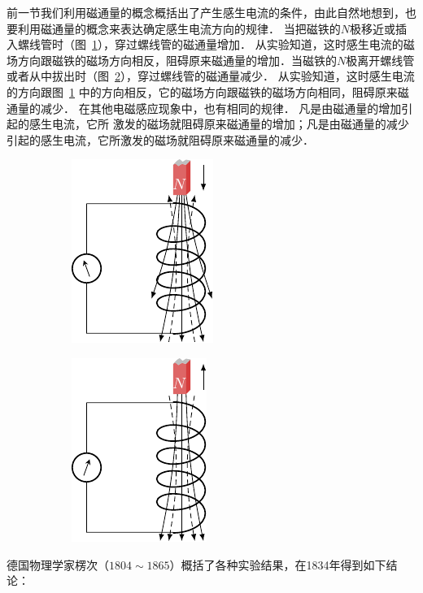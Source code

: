 前一节我们利用磁通量的概念概括出了产生感生电流的条件，由此自然地想到，也要利用磁通量的概念来表达确定感生电流方向的规律．
当把磁铁的$N$极移近或插入螺线管时（图~\ref{fig_C_2-11a}），穿过螺线管的磁通量增加．
从实验知道，这时感生电流的磁场方向跟磁铁的磁场方向相反，阻碍原来磁通量的增加．当磁铁的$N$极离开螺线管或者从中拔出时（图~\ref{fig_C_2-11b}），穿过螺线管的磁通量减少．
从实验知道，这时感生电流的方向跟图~\ref{fig_C_2-11a} 中的方向相反，它的磁场方向跟磁铁的磁场方向相同，阻碍原来磁通量的减少．
在其他电磁感应现象中，也有相同的规律．
凡是由磁通量的增加引起的感生电流，它所
激发的磁场就阻碍原来磁通量的增加；凡是由磁通量的减少引起的感生电流，它所激发的磁场就阻碍原来磁通量的减少．
\begin{figure}[htbp]
    \centering
    \begin{subfigure}{0.4\linewidth}
        \centering
        \includegraphics{fig/C/2-11a.pdf}
        \caption{}\label{fig_C_2-11a}
    \end{subfigure}
    \hfil
    \begin{subfigure}{0.4\linewidth}
        \centering
        \includegraphics{fig/C/2-11b.pdf}
        \caption{}\label{fig_C_2-11b}
    \end{subfigure}
    \caption{}\label{fig_C_2-11}
\end{figure}

德国物理学家楞次（$1804 \sim 1865$）概括了各种实验结果，在1834年得到如下结论：

